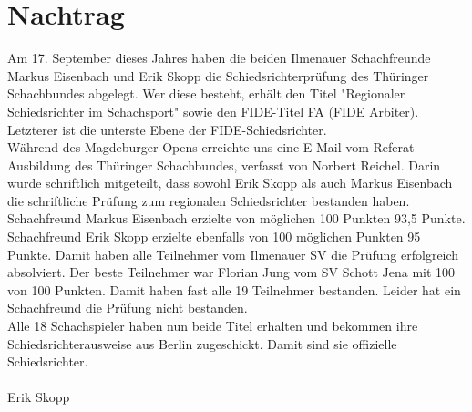\documentclass[a4paper,german]{tui-algo-seminar}
\title{\inhalt}
\author{Erik Skopp}
\newcommand{\inhalt}{Nachtrag zur RSR-Ausbildung 2023}
\begin{document}
\nolinenumbers
\maketitle
\thispagestyle{plain} %
\begin{abstract}
Bericht: \inhalt
\end{abstract}

\section{Nachtrag}
Am 17. September dieses Jahres haben die beiden Ilmenauer Schachfreunde Markus Eisenbach und Erik Skopp die Schiedsrichterprüfung des Thüringer Schachbundes abgelegt. Wer diese besteht, erhält den Titel "Regionaler Schiedsrichter im Schachsport" sowie den FIDE-Titel FA (FIDE Arbiter). Letzterer ist die unterste Ebene der FIDE-Schiedsrichter.\\
Während des Magdeburger Opens erreichte uns eine E-Mail vom Referat Ausbildung des Thüringer Schachbundes, verfasst von Norbert Reichel. Darin wurde schriftlich mitgeteilt, dass sowohl Erik Skopp als auch Markus Eisenbach die schriftliche Prüfung zum regionalen Schiedsrichter bestanden haben. Schachfreund Markus Eisenbach erzielte von möglichen 100 Punkten 93,5 Punkte. Schachfreund Erik Skopp erzielte ebenfalls von 100 möglichen Punkten 95 Punkte. Damit haben alle Teilnehmer vom Ilmenauer SV die Prüfung erfolgreich absolviert. Der beste Teilnehmer war Florian Jung vom SV Schott Jena mit 100 von 100 Punkten. Damit haben fast alle 19 Teilnehmer bestanden. Leider hat ein Schachfreund die Prüfung nicht bestanden.\\
Alle 18 Schachspieler haben nun beide Titel erhalten und bekommen ihre Schiedsrichterausweise aus Berlin zugeschickt. Damit sind sie offizielle Schiedsrichter.\\
\\
Erik Skopp
\end{document}
